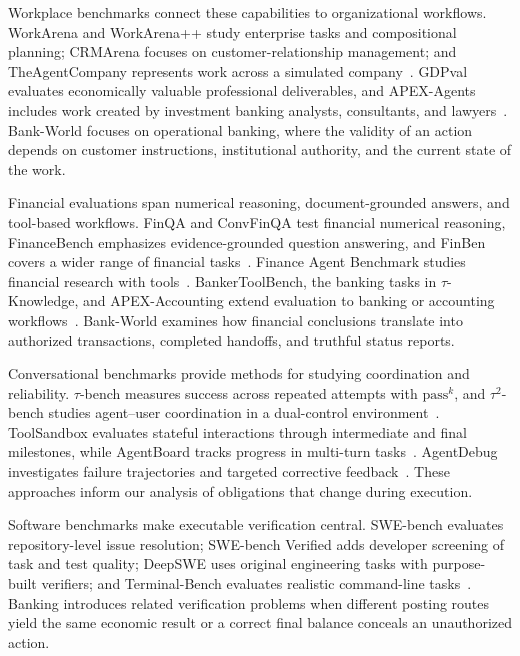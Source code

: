 \documentclass[11pt,letterpaper]{article}
\begin{document}
Workplace benchmarks connect these capabilities to organizational workflows. WorkArena and WorkArena++ study enterprise tasks and compositional planning; CRMArena focuses on customer-relationship management; and TheAgentCompany represents work across a simulated company~\cite{workarena,workarenapp,crmarena,theagentcompany}. GDPval evaluates economically valuable professional deliverables, and APEX-Agents includes work created by investment banking analysts, consultants, and lawyers~\cite{gdpval,ref5}. Bank-World focuses on operational banking, where the validity of an action depends on customer instructions, institutional authority, and the current state of the work.

Financial evaluations span numerical reasoning, document-grounded answers, and tool-based workflows. FinQA and ConvFinQA test financial numerical reasoning, FinanceBench emphasizes evidence-grounded question answering, and FinBen covers a wider range of financial tasks~\cite{finqa,convfinqa,financebench,finben}. Finance Agent Benchmark studies financial research with tools~\cite{financeagent}. BankerToolBench, the banking tasks in \(\tau\)-Knowledge, and APEX-Accounting extend evaluation to banking or accounting workflows~\cite{ref4,ref1,apexaccounting}. Bank-World examines how financial conclusions translate into authorized transactions, completed handoffs, and truthful status reports.

Conversational benchmarks provide methods for studying coordination and reliability. \(\tau\)-bench measures success across repeated attempts with $\mathrm{pass}^{k}$, and \(\tau^2\)-bench studies agent--user coordination in a dual-control environment~\cite{taubench,tau2bench}. ToolSandbox evaluates stateful interactions through intermediate and final milestones, while AgentBoard tracks progress in multi-turn tasks~\cite{toolsandbox,agentboard}. AgentDebug investigates failure trajectories and targeted corrective feedback~\cite{agentdebug}. These approaches inform our analysis of obligations that change during execution.

Software benchmarks make executable verification central. SWE-bench evaluates repository-level issue resolution; SWE-bench Verified adds developer screening of task and test quality; DeepSWE uses original engineering tasks with purpose-built verifiers; and Terminal-Bench evaluates realistic command-line tasks~\cite{swebench,sweverified,deepswe,terminalbench}. Banking introduces related verification problems when different posting routes yield the same economic result or a correct final balance conceals an unauthorized action.
\end{document}
